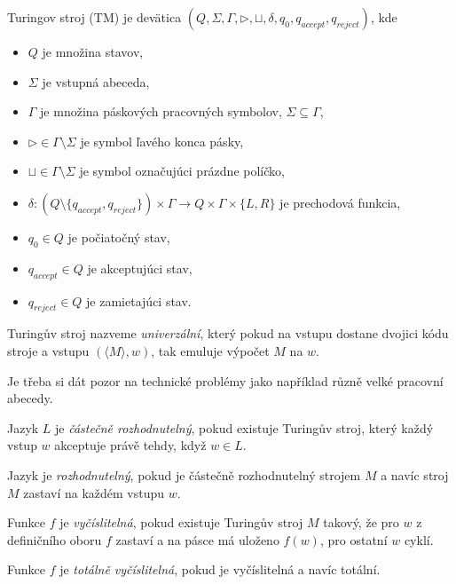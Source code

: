 \begin{definition}
    Turingov stroj (TM) je devätica $(Q, \Sigma, \Gamma, \triangleright,
	\sqcup, \delta, q_0, q_{accept}, q_{reject})$, kde
	\begin{itemize}
		\item $Q$ je množina stavov,
		\item $\Sigma$ je vstupná abeceda,
		\item $\Gamma$ je množina páskových pracovných symbolov, $\Sigma \subseteq \Gamma$,
		\item $\triangleright \in \Gamma \setminus \Sigma$ je symbol ľavého konca pásky,
		\item $\sqcup \in \Gamma \setminus \Sigma$ je symbol označujúci prázdne políčko,
		\item $\delta : (Q \setminus \{q_{accept}, q_{reject} \}) \times \Gamma \to Q \times \Gamma \times \{L,R \}$ je prechodová funkcia,
		\item $q_0 \in Q$ je počiatočný stav,
		\item $q_{accept} \in Q$ je akceptujúci stav,
		\item $q_{reject} \in Q$ je zamietajúci stav.
	\end{itemize}
\end{definition}

\begin{definition}[Univerzální TS]
Turingův stroj nazveme {\em univerzální},
který pokud na vstupu dostane dvojici kódu stroje a vstupu
$(\langle M \rangle, w)$, tak emuluje výpočet $M$ na $w$.
\end{definition}

Je třeba si dát pozor na technické problémy jako například různě velké
pracovní abecedy.

\begin{definition}
    Jazyk $L$ je {\em částečně rozhodnutelný}, pokud existuje Turingův
    stroj, který každý vstup $w$ akceptuje právě tehdy, když $w \in L$.

    Jazyk je {\em rozhodnutelný}, pokud je částečně rozhodnutelný
    strojem $M$ a navíc stroj $M$ zastaví na každém vstupu $w$.

    Funkce $f$ je {\em vyčíslitelná}, pokud existuje Turingův
    stroj $M$ takový, že pro $w$ z definičního oboru $f$ zastaví a na pásce má
    uloženo $f(w)$, pro ostatní $w$ cyklí.

    Funkce $f$ je {\em totálně vyčíslitelná}, pokud je vyčíslitelná a
    navíc totální.
\end{definition}


